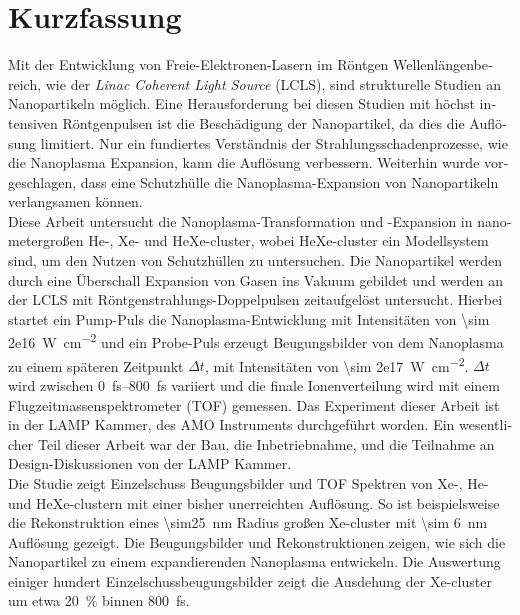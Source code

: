 \section*{Kurzfassung}
\begin{otherlanguage}{german}
Mit der Entwicklung von Freie-Elektronen-Lasern im Röntgen Wellenlängenbereich, wie der \textit{Linac Coherent Light Source} (LCLS), sind strukturelle Studien an Nanopartikeln möglich. Eine Herausforderung bei diesen Studien mit höchst intensiven Röntgenpulsen ist die Beschädigung der Nanopartikel, da dies die Auflösung limitiert. Nur ein fundiertes Verständnis der Strahlungsschadenprozesse, wie die Nanoplasma Expansion, kann die Auflösung verbessern. Weiterhin wurde vorgeschlagen, dass eine Schutzhülle die Nanoplasma-Expansion von Nanopartikeln verlangsamen können.\\[0.4\baselineskip]
%
Diese Arbeit untersucht die Nanoplasma-Transformation und -Expansion in nanometergroßen He-, Xe- und HeXe-cluster, wobei HeXe-cluster ein Modellsystem sind, um den Nutzen von Schutzhüllen zu untersuchen. Die Nanopartikel werden durch eine Überschall Expansion von Gasen ins Vakuum gebildet und werden an der LCLS mit Röntgenstrahlungs-Doppelpulsen zeitaufgelöst untersucht. Hierbei startet ein Pump-Puls die Nanoplasma-Entwicklung mit Intensitäten von \SI{\sim 2e16}{\watt\per\square\centi\meter} und ein Probe-Puls erzeugt Beugungsbilder von dem Nanoplasma zu einem späteren Zeitpunkt $\Delta t$, mit Intensitäten von \SI{\sim 2e17}{\watt\per\square\centi\meter}. $\Delta t$ wird zwischen \SIrange{0}{800}{\femto\second} variiert und die finale Ionenverteilung wird mit einem Flugzeitmassenspektrometer (TOF) gemessen. Das Experiment dieser Arbeit ist in der LAMP Kammer, des AMO Instruments durchgeführt worden. Ein wesentlicher Teil dieser Arbeit war der Bau, die Inbetriebnahme, und die Teilnahme an Design-Diskussionen von der LAMP Kammer.\\[0.4\baselineskip]
%
Die Studie zeigt Einzelschuss Beugungsbilder und TOF Spektren von Xe-, He- und HeXe-clustern mit einer bisher unerreichten Auflösung. So ist beispielsweise die Rekonstruktion eines \SI{\sim25}{\nano\meter} Radius großen Xe-cluster mit \SI{\sim 6}{\nano\meter} Auflösung gezeigt. Die Beugungsbilder und Rekonstruktionen zeigen, wie sich die Nanopartikel zu einem expandierenden Nanoplasma entwickeln. Die Auswertung einiger hundert Einzelschussbeugungsbilder zeigt die Ausdehung der Xe-cluster um etwa \SI{20}{\percent} binnen \SI{800}{\femto\second}. 

\end{otherlanguage}
